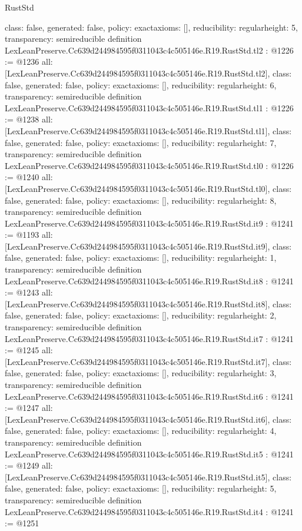 \begin{lexlean}{RustStd}
\begin{coremodule}
{  class: false,
  generated: false,
  policy: exact{axioms: []},
  reducibility: regular{height: 5},
  transparency: semireducible
}
definition LexLeanPreserve.Cc639d244984595f0311043c4c505146e.R19.RustStd.tl2 : @1226 := @1236 {
  all: [LexLeanPreserve.Cc639d244984595f0311043c4c505146e.R19.RustStd.tl2],
  class: false,
  generated: false,
  policy: exact{axioms: []},
  reducibility: regular{height: 6},
  transparency: semireducible
}
definition LexLeanPreserve.Cc639d244984595f0311043c4c505146e.R19.RustStd.tl1 : @1226 := @1238 {
  all: [LexLeanPreserve.Cc639d244984595f0311043c4c505146e.R19.RustStd.tl1],
  class: false,
  generated: false,
  policy: exact{axioms: []},
  reducibility: regular{height: 7},
  transparency: semireducible
}
definition LexLeanPreserve.Cc639d244984595f0311043c4c505146e.R19.RustStd.tl0 : @1226 := @1240 {
  all: [LexLeanPreserve.Cc639d244984595f0311043c4c505146e.R19.RustStd.tl0],
  class: false,
  generated: false,
  policy: exact{axioms: []},
  reducibility: regular{height: 8},
  transparency: semireducible
}
definition LexLeanPreserve.Cc639d244984595f0311043c4c505146e.R19.RustStd.it9 : @1241 := @1193 {
  all: [LexLeanPreserve.Cc639d244984595f0311043c4c505146e.R19.RustStd.it9],
  class: false,
  generated: false,
  policy: exact{axioms: []},
  reducibility: regular{height: 1},
  transparency: semireducible
}
definition LexLeanPreserve.Cc639d244984595f0311043c4c505146e.R19.RustStd.it8 : @1241 := @1243 {
  all: [LexLeanPreserve.Cc639d244984595f0311043c4c505146e.R19.RustStd.it8],
  class: false,
  generated: false,
  policy: exact{axioms: []},
  reducibility: regular{height: 2},
  transparency: semireducible
}
definition LexLeanPreserve.Cc639d244984595f0311043c4c505146e.R19.RustStd.it7 : @1241 := @1245 {
  all: [LexLeanPreserve.Cc639d244984595f0311043c4c505146e.R19.RustStd.it7],
  class: false,
  generated: false,
  policy: exact{axioms: []},
  reducibility: regular{height: 3},
  transparency: semireducible
}
definition LexLeanPreserve.Cc639d244984595f0311043c4c505146e.R19.RustStd.it6 : @1241 := @1247 {
  all: [LexLeanPreserve.Cc639d244984595f0311043c4c505146e.R19.RustStd.it6],
  class: false,
  generated: false,
  policy: exact{axioms: []},
  reducibility: regular{height: 4},
  transparency: semireducible
}
definition LexLeanPreserve.Cc639d244984595f0311043c4c505146e.R19.RustStd.it5 : @1241 := @1249 {
  all: [LexLeanPreserve.Cc639d244984595f0311043c4c505146e.R19.RustStd.it5],
  class: false,
  generated: false,
  policy: exact{axioms: []},
  reducibility: regular{height: 5},
  transparency: semireducible
}
definition LexLeanPreserve.Cc639d244984595f0311043c4c505146e.R19.RustStd.it4 : @1241 := @1251 {
}
\end{coremodule}
\end{lexlean}
